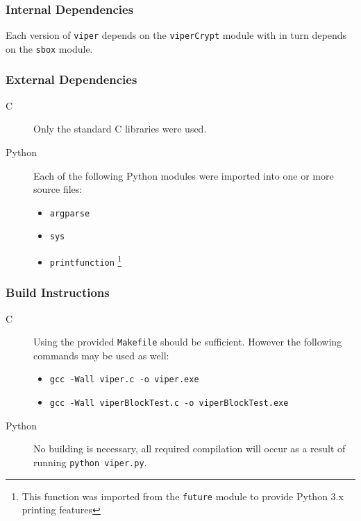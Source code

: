 \subsubsection{Internal Dependencies}
Each version of \texttt{viper} depends on the \texttt{viperCrypt} module with in turn depends on the \texttt{sbox} module.

\subsubsection{External Dependencies}
\begin{description}
\item[C] Only the standard C libraries were used.
\item[Python]
Each of the following Python modules were imported into one or more source files:
\begin{itemize}
\item \texttt{argparse}
\item \texttt{sys}
\item \texttt{print{\textunderscore}function} \footnote{This function was imported from the \texttt{future} module to provide Python 3.x printing features}
\end{itemize}
\end{description}

\subsubsection{Build Instructions}
\begin{description}
\item[C]
Using the provided \texttt{Makefile} should be sufficient. However the following commands may be used as well:
\begin{itemize}
\item \texttt{gcc -Wall viper.c -o viper.exe}
\item \texttt{gcc -Wall viperBlockTest.c -o viperBlockTest.exe}
\end{itemize}

\item[Python]
No building is necessary, all required compilation will occur as a result of running \texttt{python viper.py}.
\end{description}
